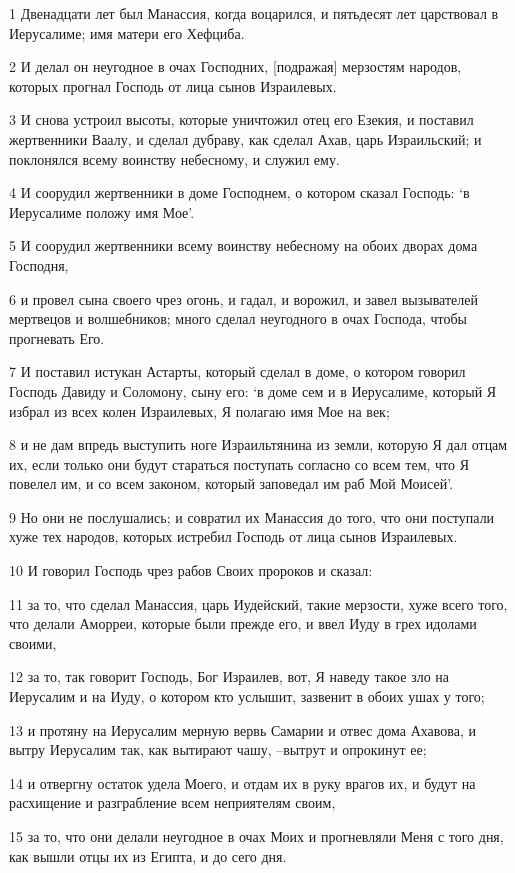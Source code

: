 \par 1 Двенадцати лет был Манассия, когда воцарился, и пятьдесят лет царствовал в Иерусалиме; имя матери его Хефциба.
\par 2 И делал он неугодное в очах Господних, [подражая] мерзостям народов, которых прогнал Господь от лица сынов Израилевых.
\par 3 И снова устроил высоты, которые уничтожил отец его Езекия, и поставил жертвенники Ваалу, и сделал дубраву, как сделал Ахав, царь Израильский; и поклонялся всему воинству небесному, и служил ему.
\par 4 И соорудил жертвенники в доме Господнем, о котором сказал Господь: `в Иерусалиме положу имя Мое'.
\par 5 И соорудил жертвенники всему воинству небесному на обоих дворах дома Господня,
\par 6 и провел сына своего чрез огонь, и гадал, и ворожил, и завел вызывателей мертвецов и волшебников; много сделал неугодного в очах Господа, чтобы прогневать Его.
\par 7 И поставил истукан Астарты, который сделал в доме, о котором говорил Господь Давиду и Соломону, сыну его: `в доме сем и в Иерусалиме, который Я избрал из всех колен Израилевых, Я полагаю имя Мое на век;
\par 8 и не дам впредь выступить ноге Израильтянина из земли, которую Я дал отцам их, если только они будут стараться поступать согласно со всем тем, что Я повелел им, и со всем законом, который заповедал им раб Мой Моисей'.
\par 9 Но они не послушались; и совратил их Манассия до того, что они поступали хуже тех народов, которых истребил Господь от лица сынов Израилевых.
\par 10 И говорил Господь чрез рабов Своих пророков и сказал:
\par 11 за то, что сделал Манассия, царь Иудейский, такие мерзости, хуже всего того, что делали Аморреи, которые были прежде его, и ввел Иуду в грех идолами своими,
\par 12 за то, так говорит Господь, Бог Израилев, вот, Я наведу такое зло на Иерусалим и на Иуду, о котором кто услышит, зазвенит в обоих ушах у того;
\par 13 и протяну на Иерусалим мерную вервь Самарии и отвес дома Ахавова, и вытру Иерусалим так, как вытирают чашу, --вытрут и опрокинут ее;
\par 14 и отвергну остаток удела Моего, и отдам их в руку врагов их, и будут на расхищение и разграбление всем неприятелям своим,
\par 15 за то, что они делали неугодное в очах Моих и прогневляли Меня с того дня, как вышли отцы их из Египта, и до сего дня.
